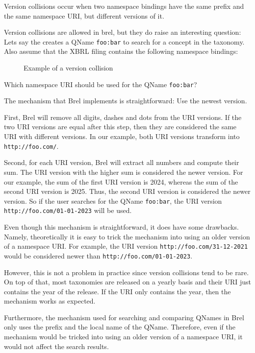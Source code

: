 Version collisions occur when two namespace bindings have the same prefix and the same namespace URI, but different versions of it.

Version collisions are allowed in brel, but they do raise an interesting question:
Lets say the creates a QName \texttt{foo:bar} to search for a concept in the taxonomy. 
Also assume that the XBRL filing contains the following namespace bindings:

\begin{figure}[H]
    \caption{Example of a version collision}
    \label{fig:version_collision_example}
\end{figure}

Which namespace URI should be used for the QName \texttt{foo:bar}?

The mechanism that Brel implements is straightforward: Use the newest version.

First, Brel will remove all digits, dashes and dots from the URI versions. 
If the two URI versions are equal after this step, then they are considered the same URI with different versions.
In our example, both URI versions transform into \texttt{http://foo.com/}.

Second, for each URI version, Brel will extract all numbers and compute their sum. The URI version with the higher sum is considered the newer version.
For our example, the sum of the first URI version is 2024, whereas the sum of the second URI version is 2025. 
Thus, the second URI version is considered the newer version. 
So if the user searches for the QName \texttt{foo:bar}, the URI version \texttt{http://foo.com/01-01-2023} will be used.

Even though this mechanism is straightforward, it does have some drawbacks. 
Namely, theoretically it is easy to trick the mechanism into using an older version of a namespace URI.
For example, the URI version \texttt{http://foo.com/31-12-2021} would be considered newer than \texttt{http://foo.com/01-01-2023}.

However, this is not a problem in practice since version collisions tend to be rare.
On top of that, most taxonomies are released on a yearly basis and their URI just contains the year of the release.
If the URI only contains the year, then the mechanism works as expected.

Furthermore, the mechanism used for searching and comparing QNames in Brel only uses the prefix and the local name of the QName.
Therefore, even if the mechanism would be tricked into using an older version of a namespace URI, it would not affect the search results.

